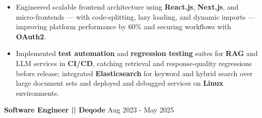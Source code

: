 \documentclass[100pt,a4paper]{article}
\begin{document}
\begin{itemize}
\item {Engineered scalable frontend architecture using \textbf{React.js}, \textbf{Next.js}, and micro-frontends — with code-splitting, lazy loading, and dynamic imports — improving platform performance by 60\% and securing workflows with \textbf{OAuth2}.}
\item Implemented \textbf{test automation} and \textbf{regression testing} suites for \textbf{RAG} and LLM services in \textbf{CI/CD}, catching retrieval and response-quality regressions before release; integrated \textbf{Elasticsearch} for keyword and hybrid search over large document sets and deployed and debugged services on \textbf{Linux} environments.
\end{itemize}

\vspace{5pt}
\textbf{Software Engineer || Deqode}
\hfill Aug 2023 - May 2025
\end{document}

